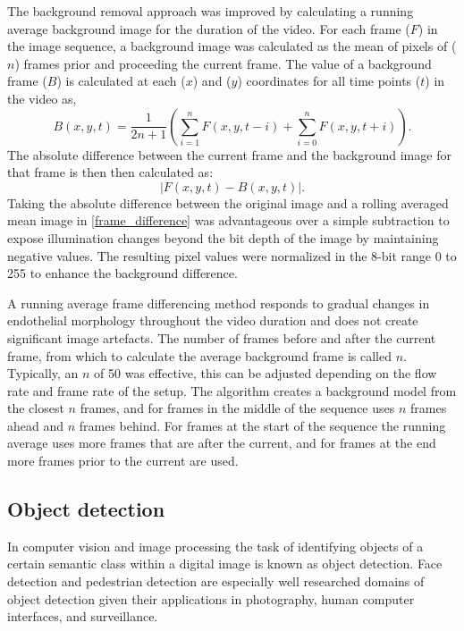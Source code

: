 The background removal approach was improved by calculating a running average background image for the duration of the video. For each frame ($F$) in the image sequence, a background image was calculated as the mean of pixels of ($n$) frames prior and proceeding the current frame. The value of a background frame ($B$) is calculated at each ($x$) and ($y$) coordinates for all time points ($t$) in the video as,
\begin{equation}
B(x,y,t) = \frac{1}{2n+1}\left(\sum_{i=1}^{n} F(x,y,t-i) + \sum_{i=0}^{n} F(x,y,t+i)\right).
\end{equation}
The absolute difference between the current frame and the background image for that frame is then then calculated as:
\begin{equation}
\left|F(x,y,t) - B(x,y,t)\right|.
\label{frame_difference}
\end{equation}
Taking the absolute difference between the original image and a rolling averaged mean image in \autoref{frame_difference} was advantageous over a simple subtraction to expose illumination changes beyond the bit depth of the image by maintaining negative values. The resulting pixel values were normalized in the 8-bit range 0 to 255 to enhance the background difference.

A running average frame differencing method responds to gradual changes in endothelial morphology throughout the video duration and does not create significant image artefacts. The number of frames before and after the current frame, from which to calculate the average background frame is called $n$. Typically, an $n$ of 50 was effective, this can be adjusted depending on the flow rate and frame rate of the setup. The algorithm creates a background model from the closest $n$ frames, and for frames in the middle of the sequence uses $n$ frames ahead and $n$ frames behind. For frames at the start of the sequence the running average uses more frames that are after the current, and for frames at the end more frames prior to the current are used.

\subsection{Object detection}
\label{leukocytes:processing:detection}
In computer vision and image processing the task of identifying objects of a certain semantic class within a digital image is known as object detection. Face detection and pedestrian detection are especially well researched domains of object detection given their applications in photography, human computer interfaces, and surveillance.

